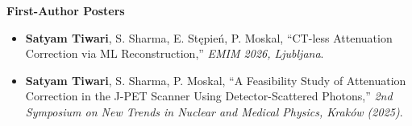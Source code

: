 \textcolor{accentblue}{\textbf{First-Author Posters}}
\begin{itemize}
\item \textbf{Satyam Tiwari}, S. Sharma, E. St{\k{e}}pie{\'n}, P. Moskal, ``CT-less Attenuation Correction via ML Reconstruction,'' \emph{EMIM 2026, Ljubljana}.
\item \textbf{Satyam Tiwari}, S. Sharma, P. Moskal, ``A Feasibility Study of Attenuation Correction in the J-PET Scanner Using Detector-Scattered Photons,'' \emph{2nd Symposium on New Trends in Nuclear and Medical Physics, Krak{\'o}w (2025)}.
\end{itemize}
